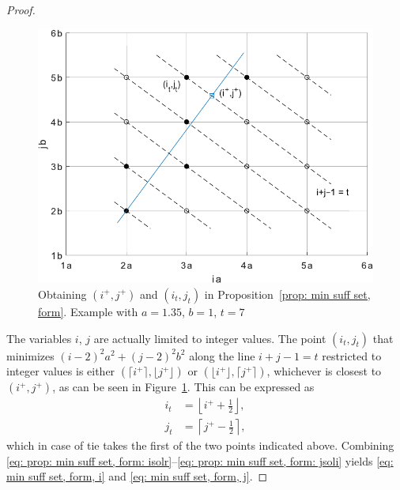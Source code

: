 \documentclass[12pt, a4paper]{article}
\newcommand{\tiles}{t} %
\newcommand{\isolr}{i^+}
\newcommand{\jsolr}{j^+}
\begin{document}
\begin{proof}
\begin{figure}%
\centering%
\includegraphics[width=.7\textwidth]{mss}%
\caption{Obtaining $(\isolr, \jsolr)$ and $(i_\tiles, j_\tiles)$ in  Proposition~\ref{prop: min suff set, form}. Example with $a=1.35$, $b=1$, $\tiles=7$%
}%
\label{fig: min suff set, form}%
\end{figure}%

The variables $i$, $j$ are actually limited to integer values. The point $(i_\tiles, j_\tiles)$ that minimizes $(i-2)^2 a^2 + (j-2)^2 b^2$ along the line $i+j-1=\tiles$ restricted to integer values is either $(\lceil \isolr \rceil, \lfloor \jsolr \rfloor)$ or $(\lfloor \isolr \rfloor, \lceil \jsolr \rceil)$, whichever is closest to $(\isolr, \jsolr)$, as can be seen in Figure~\ref{fig: min suff set, form}. This can be expressed as
\begin{align}
\label{eq: prop: min suff set, form: isoli}
i_\tiles &= \left\lfloor \isolr + \frac 1 2 \right\rfloor, \\
\label{eq: prop: min suff set, form: jsoli}
j_\tiles &= \left\lceil \jsolr - \frac 1 2 \right\rceil,
\end{align}
which in case of tie takes the first of the two points indicated above. Combining \eqref{eq: prop: min suff set, form: isolr}--\eqref{eq: prop: min suff set, form: jsoli}
yields \eqref{eq: min suff set, form, i} and \eqref{eq: min suff set, form, j}.


\end{proof}
\end{document}
